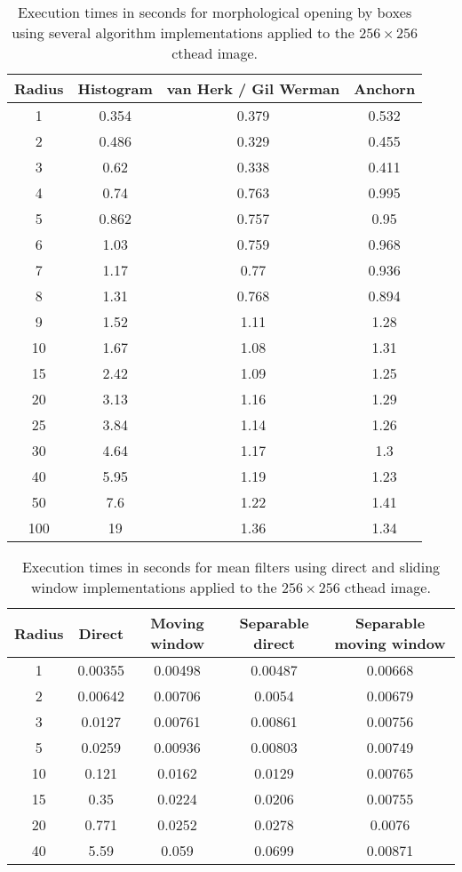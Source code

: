 \documentclass{InsightArticle}
\begin{document}
\begin{table}[phtb]
\centering
\small
\begin{tabular}{cccc}
\hline
Radius	&	Histogram	&	van Herk / Gil Werman	&	Anchorn	\\
\hline
1	&	0.354	&	0.379	&	0.532	\\
2	&	0.486	&	0.329	&	0.455	\\
3	&	0.62	&	0.338	&	0.411	\\
4	&	0.74	&	0.763	&	0.995	\\
5	&	0.862	&	0.757	&	0.95	\\
6	&	1.03	&	0.759	&	0.968	\\
7	&	1.17	&	0.77	&	0.936	\\
8	&	1.31	&	0.768	&	0.894	\\
9	&	1.52	&	1.11	&	1.28	\\
10	&	1.67	&	1.08	&	1.31	\\
15	&	2.42	&	1.09	&	1.25	\\
20	&	3.13	&	1.16	&	1.29	\\
25	&	3.84	&	1.14	&	1.26	\\
30	&	4.64	&	1.17	&	1.3	\\
40	&	5.95	&	1.19	&	1.23	\\
50	&	7.6	&	1.22	&	1.41	\\
100	&	19	&	1.36	&	1.34	\\
\hline
\hline
\end{tabular}
\caption{Execution times in seconds for morphological opening by boxes using several algorithm implementations applied to the $256 \times 256$ cthead image.\label{tab:perf2Dpoly}}
\end{table}


\begin{table}[phtb]
\centering
\small
\begin{tabular}{ccccc}
\hline
Radius	&	Direct	&	Moving window	&	Separable direct	&	Separable moving window	\\
\hline
1	&	0.00355	&	0.00498	&	0.00487	&	0.00668	\\
2	&	0.00642	&	0.00706	&	0.0054	&	0.00679	\\
3	&	0.0127	&	0.00761	&	0.00861	&	0.00756	\\
5	&	0.0259	&	0.00936	&	0.00803	&	0.00749	\\
10	&	0.121	&	0.0162	&	0.0129	&	0.00765	\\
15	&	0.35	&	0.0224	&	0.0206	&	0.00755	\\
20	&	0.771	&	0.0252	&	0.0278	&	0.0076	\\
40	&	5.59	&	0.059	&	0.0699	&	0.00871	\\
\hline
\hline
\end{tabular}
\caption{Execution times in seconds for mean filters using direct and sliding window implementations applied to the $256 \times 256$ cthead image.\label{tab:perfRankMean}}
\end{table}
\end{document}

